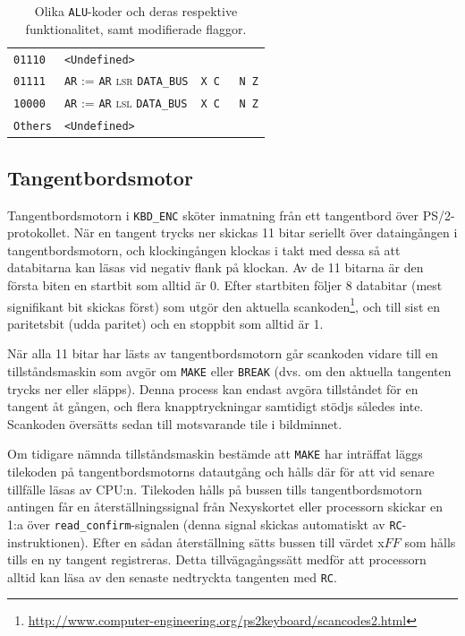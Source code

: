 \documentclass[]{article}
\begin{document}
\begin{table}[H]
\begin{tabular}{llc}
	\texttt{01110}  & \texttt{<Undefined>}                                   &  \\
	\texttt{01111}  & \texttt{AR} := \texttt{AR} \textsc{lsr} \texttt{DATA\_BUS}                       &  \texttt{X C { } N Z}    \\
	\texttt{10000}  & \texttt{AR} := \texttt{AR} \textsc{lsl} \texttt{DATA\_BUS}                       &  \texttt{X C { } N Z}    \\
	\texttt{Others} & \texttt{<Undefined>}                                   &
\end{tabular}
\caption{Olika \texttt{ALU}-koder och deras respektive funktionalitet, samt modifierade flaggor.}
\end{table}

\subsection{Tangentbordsmotor}
Tangentbordsmotorn i \texttt{KBD\_ENC} sköter inmatning från ett tangentbord över PS/2-protokollet. När en tangent trycks ner skickas 11 bitar seriellt över dataingången i tangentbordsmotorn, och klockingången klockas i takt med dessa så att databitarna kan läsas vid negativ flank på klockan. Av de 11 bitarna är den första biten en startbit som alltid är 0. Efter startbiten följer 8 databitar (mest signifikant bit skickas först)  som utgör den aktuella scankoden\footnote{\url{http://www.computer-engineering.org/ps2keyboard/scancodes2.html}}, och till sist en paritetsbit (udda paritet) och en stoppbit som alltid är 1.

När alla 11 bitar har lästs av tangentbordsmotorn går scankoden vidare till en tillståndsmaskin som avgör om \texttt{MAKE} eller \texttt{BREAK} (dvs. om den aktuella tangenten trycks ner eller släpps). Denna process kan endast avgöra tillståndet för en tangent åt gången, och flera knapptryckningar samtidigt stödjs således inte. Scankoden översätts sedan till motsvarande tile i bildminnet.

Om tidigare nämnda tillståndsmaskin bestämde att \texttt{MAKE} har inträffat läggs tilekoden på tangentbordsmotorns datautgång och hålls där för att vid senare tillfälle läsas av CPU:n. Tilekoden hålls på bussen tills tangentbordsmotorn antingen får en återställningssignal från Nexyskortet eller processorn skickar en 1:a över \texttt{read\_confirm}-signalen (denna signal skickas automatiskt av \texttt{RC}-instruktionen). Efter en sådan återställning sätts bussen till värdet x$FF$ som hålls tills en ny tangent registreras. Detta tillvägagångssätt medför att processorn alltid kan läsa av den senaste nedtryckta tangenten med \texttt{RC}.
\end{document}
